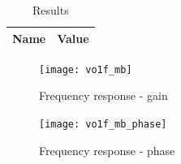 \begin{table}[H]
  \centering
  \begin{tabular}{|c|c|}
    \hline
        {\bf Name} & {\bf Value} \\
        \hline
        \hline
        
        \hline
  \end{tabular}
  \caption{Results}
  \label{sim_mb_results}
\end{table}

\begin{figure}[H]
\centering
\texttt{[image: vo1f\_mb]}
\caption{Frequency response - gain}
\end{figure}

\begin{figure}[H]
\centering
\texttt{[image: vo1f\_mb\_phase]}
\caption{Frequency response - phase}
\end{figure}
